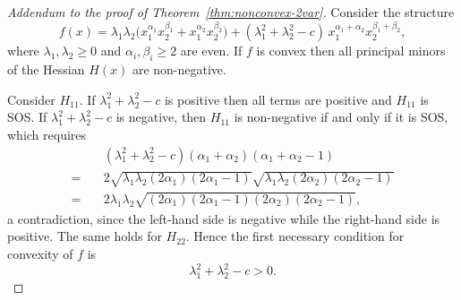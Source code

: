 \documentclass[12pt]{elsarticle}
\theoremstyle{definition}
\begin{document}
\begin{proof}[Addendum to the proof of Theorem~\ref{thm:nonconvex-2var}]
Consider the structure
\begin{equation}\label{eq:nonconvex-form}
f(x)=\lambda_1\lambda_2\big(x_1^{\alpha_1}x_2^{\beta_1} + x_1^{\alpha_2}x_2^{\beta_2}\big) + (\lambda_1^2 + \lambda_2^2 - c)\,x_1^{\alpha_1 + \alpha_2}x_2^{\beta_1 + \beta_2},
\end{equation}
where $\lambda_1,\lambda_2\geq 0$ and $\alpha_i,\beta_i\geq2$ are even. If $f$ is convex then all principal minors of the Hessian $H(x)$ are non-negative.

Consider $H_{11}$. If $\lambda_1^2 + \lambda_2^2 - c$ is positive then all terms are positive and $H_{11}$ is SOS. If $\lambda_1^2 + \lambda_2^2 - c$ is negative, then $H_{11}$ is non-negative if and only if it is SOS, which requires
\[
\begin{aligned}
& (\lambda_1^2 + \lambda_2^2 - c)(\alpha_1 + \alpha_2)(\alpha_1 + \alpha_2 - 1)\\
= \quad& 2\sqrt{\lambda_1\lambda_2(2\alpha_1)(2\alpha_1 - 1)}\sqrt{\lambda_1\lambda_2(2\alpha_2)(2\alpha_2 - 1)}\\
= \quad& 2\lambda_1\lambda_2\sqrt{(2\alpha_1)(2\alpha_1 - 1)(2\alpha_2)(2\alpha_2 - 1)} ,
\end{aligned}
\]
a contradiction, since the left-hand side is negative while the right-hand side is positive. The same holds for $H_{22}$. Hence the first necessary condition for convexity of $f$ is
\[
\lambda_1^2 + \lambda_2^2 - c > 0 .
\]


\end{proof}
\end{document}
